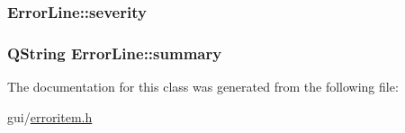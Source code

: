 \hypertarget{class_error_line_af3ac864f5147bba01d2aaccb6c890bfc}{
\subsubsection[{severity}]{ Error\-Line\-::severity}}\label{class_error_line_af3ac864f5147bba01d2aaccb6c890bfc}
\hypertarget{class_error_line_aa1ecd5636cb14a74f016b1768e00aaf9}{
\subsubsection[{summary}]{\setlength{\rightskip}{0pt plus 5cm}Q\-String Error\-Line\-::summary}}\label{class_error_line_aa1ecd5636cb14a74f016b1768e00aaf9}


The documentation for this class was generated from the following file\-:\begin{DoxyCompactItemize}
\item 
gui/\hyperlink{erroritem_8h}{erroritem.\-h}\end{DoxyCompactItemize}
